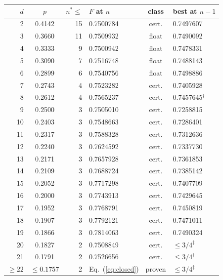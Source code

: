 \begin{tabular}{@{}rcrlcl@{}}
\toprule
$d$ & $p$ & $n^*\le$ & $F$ at $n$ & class & best at $n-1$ \\
\midrule
2 & 0.4142 & 15 & 0.7500784 & cert. & 0.7497607 \\
3 & 0.3660 & 11 & 0.7509932 & float & 0.7490092 \\
4 & 0.3333 & 9 & 0.7500942 & float & 0.7478331 \\
5 & 0.3090 & 7 & 0.7516748 & float & 0.7488143 \\
6 & 0.2899 & 6 & 0.7540756 & float & 0.7498886 \\
7 & 0.2743 & 4 & 0.7523282 & cert. & 0.7405928 \\
8 & 0.2612 & 4 & 0.7565237 & cert. & 0.7457645$^{\dagger}$ \\
9 & 0.2500 & 3 & 0.7505010 & cert. & 0.7258815 \\
10 & 0.2403 & 3 & 0.7548663 & cert. & 0.7286401 \\
11 & 0.2317 & 3 & 0.7588328 & cert. & 0.7312636 \\
12 & 0.2240 & 3 & 0.7624592 & cert. & 0.7337730 \\
13 & 0.2171 & 3 & 0.7657928 & cert. & 0.7361853 \\
14 & 0.2109 & 3 & 0.7688724 & cert. & 0.7385142 \\
15 & 0.2052 & 3 & 0.7717298 & cert. & 0.7407709 \\
16 & 0.2000 & 3 & 0.7743913 & cert. & 0.7429645 \\
17 & 0.1952 & 3 & 0.7768791 & cert. & 0.7450819 \\
18 & 0.1907 & 3 & 0.7792121 & cert. & 0.7471011 \\
19 & 0.1866 & 3 & 0.7814063 & cert. & 0.7490324 \\
20 & 0.1827 & 2 & 0.7508849 & cert. & $\le 3/4^{\ddagger}$ \\
21 & 0.1791 & 2 & 0.7526656 & cert. & $\le 3/4^{\ddagger}$ \\
$\ge 22$ & $\le 0.1757$ & 2 & Eq.~(\ref{eq:closed}) & proven & $\le 3/4^{\ddagger}$ \\
\bottomrule
\end{tabular}
